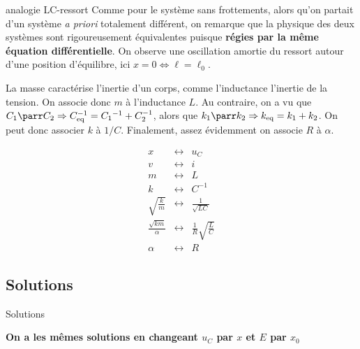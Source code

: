 \documentclass[../main/main.tex]{subfiles}
\begin{document}
\begin{rema}[label=rema:ressortlibre, sidebyside, righthand ratio=.6]{analogie LC-ressort}
    Comme pour le système sans frottements, alors qu'on partait d'un système
    \textit{a priori} totalement différent, on remarque que la physique des deux
    systèmes sont rigoureusement équivalentes puisque \textbf{régies par la même
    équation différentielle}. On observe une oscillation amortie du ressort
    autour d'une position d'équilibre, ici $x=0 \Leftrightarrow \ell = \ell_0$.
    \tcblower

    \begin{minipage}{0.6\linewidth}
        La masse caractérise l'inertie d'un corps, comme l'inductance l'inertie de
        la tension. On associe donc $m$ à l'inductance $L$. Au contraire, on a vu
        que $C_1 \parr C_2 \Rightarrow C_{\rm eq}^{-1} = C_1{}^{-1} + C_2^{-1}$,
        alors que $k_1 \parr k_2 \Rightarrow k_{\rm eq} = k_1 + k_2$. On peut donc
        associer $k$ à $1/C$. Finalement, assez évidemment on associe $R$ à $\alpha$.
    \end{minipage}
    \begin{minipage}{0.39\linewidth}
        \[
        \begin{array}{rlc}
            x & \longleftrightarrow & u_C\\
            v & \longleftrightarrow & i\\
            m & \longleftrightarrow & L\\
            k & \longleftrightarrow & C^{-1}\\
            \sqrt{\frac{k}{m}} & \longleftrightarrow & \frac{1}{\sqrt{LC}}\\
            \frac{\sqrt{km}}{\alpha} & \longleftrightarrow & \frac{1}{R}
            \sqrt{\frac{L}{C}}\\
            \alpha & \longleftrightarrow & R
        \end{array}
    \]
    \end{minipage}
\end{rema}

\subsection{Solutions}
\begin{center}
    \begin{prop}[width=.8\linewidth, label=prop:ressortsolu]{Solutions}
        \begin{center}
            \textbf{On a les mêmes solutions en changeant $u_C$ par $x$ et $E$
            par $x_0$}
        \end{center}
    \end{prop}
\end{center}
\end{document}
